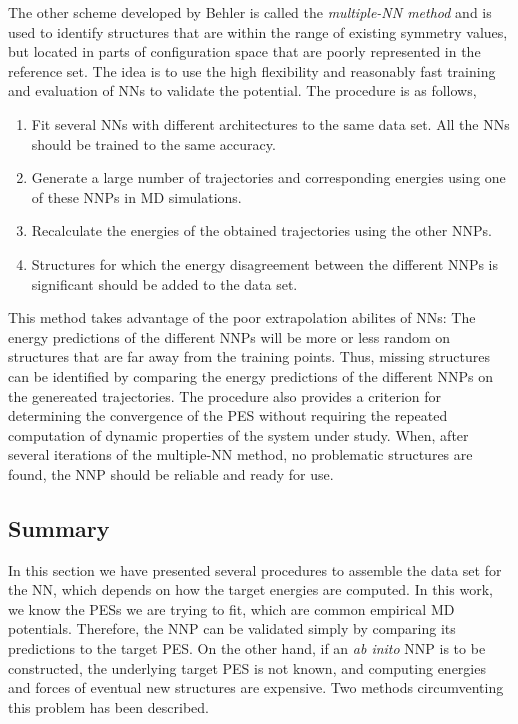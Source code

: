 \documentclass[twoside,english]{uiofysmaster}
\begin{document}
The other scheme developed by Behler is called the \textit{multiple-NN method} and is used to identify 
structures that are within the range of existing symmetry values, but located
in parts of configuration space that are poorly represented in the reference set.
The idea is to use the high flexibility and reasonably fast training and evaluation of NNs to validate 
the potential. The procedure is as follows,
\begin{enumerate}
 \item Fit several NNs with different architectures to the same data set. All the NNs should be trained
 to the same accuracy. 
 \item Generate a large number of trajectories and corresponding energies using one of these NNPs in MD simulations.
 \item Recalculate the energies of the obtained trajectories using the other NNPs.
 \item Structures for which the energy disagreement between the different NNPs is significant should be added to 
 the data set.
\end{enumerate}
This method takes advantage of the poor extrapolation abilites of NNs: The energy predictions of the different NNPs will
be more or less random on structures that are far away from the training points. Thus, missing structures can 
be identified by comparing the energy predictions of the different NNPs on the genereated trajectories. The procedure 
also provides a criterion for determining the convergence of the PES without requiring the repeated computation 
of dynamic properties of the system under study. When, after several iterations of the multiple-NN method,
no problematic structures are found, the NNP should be reliable and ready for use. 

\subsection{Summary}
In this section we have presented several procedures to 
assemble the data set for the NN, which depends on how the target energies are computed. 
In this work, we know the PESs we are trying to fit, which are common empirical MD potentials. 
Therefore, the NNP can be validated simply by comparing its predictions to the target PES.  
On the other hand, if an \textit{ab inito} NNP is to be constructed, the underlying target PES is not known, 
and computing energies and forces of eventual new structures are expensive. Two methods circumventing
this problem has been described.
\end{document}
